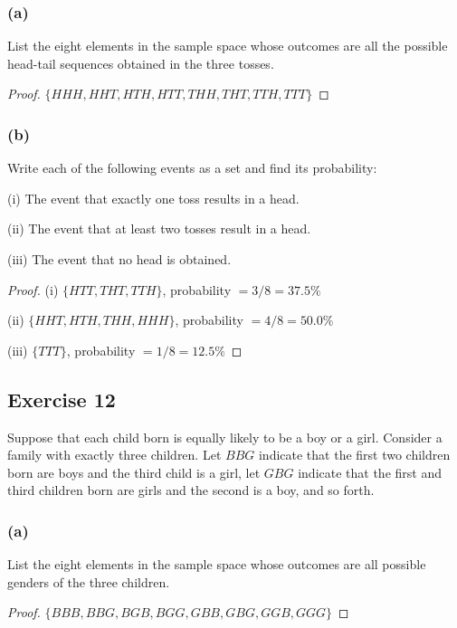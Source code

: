 \documentclass[14pt]{extarticle}
\begin{document}
\subsubsection{(a)}
List the eight elements in the sample space whose outcomes are all the possible head-tail sequences obtained in the
three tosses.

\begin{proof}
     \(\{HHH, HHT, HTH, HTT, THH, THT, TTH, TTT\}\)
\end{proof}

\subsubsection{(b)}
Write each of the following events as a set and find its probability:

(i) The event that exactly one toss results in a head.

(ii) The event that at least two tosses result in a head.

(iii) The event that no head is obtained.

\begin{proof}
     (i) \(\{HTT, THT, TTH\}\), probability \(= 3/8 = 37.5\%\)

     (ii) \(\{HHT, HTH, THH, HHH\}\), probability \(= 4/8 = 50.0\%\)

     (iii) \(\{TTT\}\), probability \(= 1/8 = 12.5\%\)
\end{proof}

\subsection{Exercise 12}
Suppose that each child born is equally likely to be a boy or a girl. Consider a family with exactly three children.
Let \(BBG\) indicate that the first two children born are boys and the third child is a girl, let \(GBG\) indicate
that the first and third children born are girls and the second is a boy, and so forth.

\subsubsection{(a)}
List the eight elements in the sample space whose outcomes are all possible genders of the three children.

\begin{proof}
     \(\{BBB, BBG, BGB, BGG, GBB, GBG, GGB, GGG\}\)
\end{proof}
\end{document}
